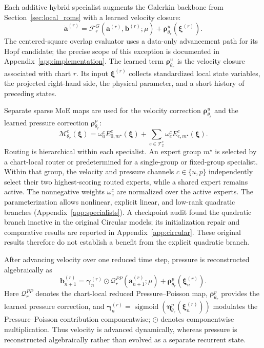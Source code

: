 Each additive hybrid specialist augments the Galerkin backbone from
Section~\ref{sec:local_roms} with a learned velocity closure:
\begin{equation}
  \dot{\bm a}^{(r)}=
  \mathcal F_r^{G}(\bm a^{(r)},\bm b^{(r)};\mu)
  +\bm\rho^u_{\theta_r}(\bm\xi^{(r)}).
  \label{eq:main_specialist}
\end{equation}
The centered-square overlap evaluator uses a data-only advancement path for its Hopf candidate; the precise scope of this exception is documented in Appendix~\ref{app:implementation}. The learned term $\bm\rho^u_{\theta_r}$ is the velocity closure associated with chart $r$. Its input $\bm\xi^{(r)}$ collects standardized local state variables, the projected right-hand side, the physical parameter, and a short history of preceding states.

Separate sparse MoE maps are used for the velocity correction $\bm\rho^u_{\theta_r}$ and the learned pressure correction $\bm\rho^p_{\theta_r}$:
\begin{equation}
  \mathcal M^c_{\theta_r}(\bm\xi)=
  \omega^c_0 E^c_{0,m^\star}(\bm\xi)+
  \sum_{e\in\mathcal T_2^c}\omega^c_e E^c_{e,m^\star}(\bm\xi).
  \label{eq:main_inner_moe}
\end{equation}
Routing is hierarchical within each specialist. An expert group $m^\star$ is selected by a chart-local router or predetermined for a single-group or fixed-group specialist. Within that group, the velocity and pressure channels $c\in\{u,p\}$ independently select their two highest-scoring routed experts, while a shared expert remains active. The nonnegative weights $\omega_e^c$ are normalized over the active experts. The parameterization allows nonlinear, explicit linear, and low-rank quadratic branches (Appendix~\ref{app:specialists}). A checkpoint audit found the quadratic branch inactive in the original Circular models; its initialization repair and comparative results are reported in Appendix~\ref{app:circular}. These original results therefore do not establish a benefit from the explicit quadratic branch.

After advancing velocity over one reduced time step, pressure is reconstructed algebraically as
\begin{equation}
  \bm b_{n+1}^{(r)}
  =\bm\gamma_n^{(r)}\odot\mathcal Q_r^{PP}(\bm a_{n+1}^{(r)};\mu)
  +\bm\rho^p_{\theta_r}(\bm\xi_n^{(r)}).
  \label{eq:main_pressure_closure}
\end{equation}
Here $\mathcal Q_r^{PP}$ denotes the chart-local reduced Pressure--Poisson map, $\bm\rho^p_{\theta_r}$ provides the learned pressure correction, and $\bm\gamma_n^{(r)} =\operatorname{sigmoid}(\bm\eta^p_{\theta_r}(\bm\xi_n^{(r)}))$ modulates the Pressure--Poisson contribution componentwise; $\odot$ denotes componentwise multiplication. Thus velocity is advanced dynamically, whereas pressure is reconstructed algebraically rather than evolved as a separate recurrent state.


